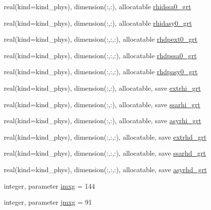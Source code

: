 \begin{DoxyCompactItemize}
\item 
real(kind=kind\+\_\+phys), dimension(\+:,\+:), allocatable \hyperlink{group__module__radiation__aerosols_gaea46db63db26a316e73640bc63f75383}{rhidssa0\+\_\+grt}
\item 
real(kind=kind\+\_\+phys), dimension(\+:,\+:), allocatable \hyperlink{group__module__radiation__aerosols_ga8491a714c86e9bd7ebdc401662f5068e}{rhidasy0\+\_\+grt}
\item 
real(kind=kind\+\_\+phys), dimension(\+:,\+:,\+:), allocatable \hyperlink{group__module__radiation__aerosols_ga35a5c7b67a3cf11c5016a693e115d384}{rhdpext0\+\_\+grt}
\item 
real(kind=kind\+\_\+phys), dimension(\+:,\+:,\+:), allocatable \hyperlink{group__module__radiation__aerosols_ga40d680662eadf30221997dadcce734b1}{rhdpssa0\+\_\+grt}
\item 
real(kind=kind\+\_\+phys), dimension(\+:,\+:,\+:), allocatable \hyperlink{group__module__radiation__aerosols_gab5a0bbefbfed6b393f0abad26e6e4d04}{rhdpasy0\+\_\+grt}
\item 
real(kind=kind\+\_\+phys), dimension(\+:,\+:), allocatable, save \hyperlink{group__module__radiation__aerosols_gacb7ff037be78e950ea42d956816c93d5}{extrhi\+\_\+grt}
\item 
real(kind=kind\+\_\+phys), dimension(\+:,\+:), allocatable, save \hyperlink{group__module__radiation__aerosols_gae8587d9b4ebd9cf5d363a82d15049324}{ssarhi\+\_\+grt}
\item 
real(kind=kind\+\_\+phys), dimension(\+:,\+:), allocatable, save \hyperlink{group__module__radiation__aerosols_ga4b5f80817af9f2116618d6c8f0e194de}{asyrhi\+\_\+grt}
\item 
real(kind=kind\+\_\+phys), dimension(\+:,\+:,\+:), allocatable, save \hyperlink{group__module__radiation__aerosols_ga07bfe1ada075519d1d3ceabe21b65a96}{extrhd\+\_\+grt}
\item 
real(kind=kind\+\_\+phys), dimension(\+:,\+:,\+:), allocatable, save \hyperlink{group__module__radiation__aerosols_ga4aa91ab1d0b9d71c704dc565ef4704bf}{ssarhd\+\_\+grt}
\item 
real(kind=kind\+\_\+phys), dimension(\+:,\+:,\+:), allocatable, save \hyperlink{group__module__radiation__aerosols_ga2da45b8bd425415ca417f6590cc54da6}{asyrhd\+\_\+grt}
\item 
integer, parameter \hyperlink{group__module__radiation__aerosols_gaa7b2e0e1d0669af4efc75cb32301f1f1}{imxg} = 144
\item 
integer, parameter \hyperlink{group__module__radiation__aerosols_ga816ee06781e63adf8752a9a67ab2da2d}{jmxg} = 91

\end{DoxyCompactItemize}

